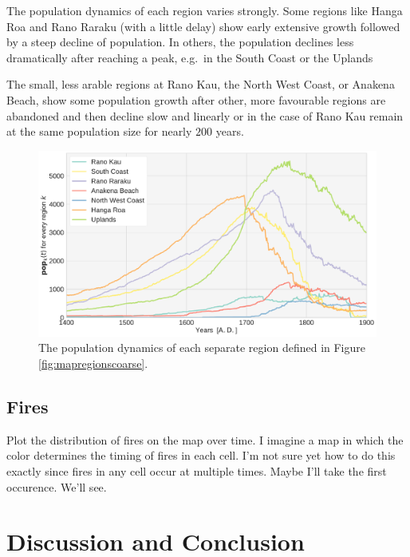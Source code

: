 The population dynamics of each region varies strongly. 
Some regions like Hanga Roa and Rano Raraku (with a little delay) show early extensive growth followed by a steep decline of population.
In others, the population declines less dramatically after reaching a peak, e.g.\ in the South Coast or the Uplands 

The small, less arable regions at Rano Kau, the North West Coast, or Anakena Beach, show some population growth after other, more favourable regions are abandoned and then decline slow and linearly or in the case of Rano Kau remain at the same population size for nearly $200$ years.

\begin{figure}
	\centering
	\includegraphics[width=1.0\linewidth]{images/Results/Standard/RegionalStats}
	\caption{The population dynamics of each separate region defined in Figure \ref{fig:mapregionscoarse}.}
	\label{fig:regionalstats}
\end{figure}

\section{Fires}
Plot the distribution of fires on the map over time. 
I imagine a map in which the color determines the timing of fires in each cell. 
I'm not sure yet how to do this exactly since fires in any cell occur at multiple times. Maybe I'll take the first occurence. We'll see.



\chapter{Discussion and Conclusion}

